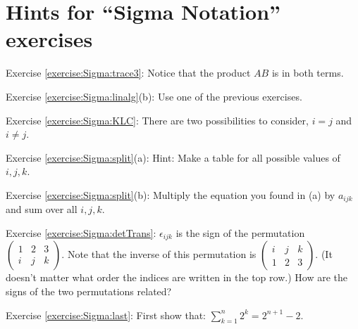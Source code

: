 \section{Hints for ``Sigma Notation'' exercises}\label{sec:sigma:hints} 


\noindent Exercise \ref{exercise:Sigma:trace3}: Notice that the product ${AB}$ is in both terms.

\noindent Exercise \ref{exercise:Sigma:linalg}(b): Use one of the previous exercises.

\noindent Exercise \ref{exercise:Sigma:KLC}: There are two possibilities to consider, $i=j$ and $i \neq j$.

\noindent Exercise \ref{exercise:Sigma:split}(a): Hint: Make a table for all possible values of $i,j,k$.

\noindent Exercise \ref{exercise:Sigma:split}(b): Multiply the equation you found in (a) by $a_{ijk}$ and sum over all $i,j,k$.

\noindent Exercise \ref{exercise:Sigma:detTrans}: $\epsilon_{ijk}$ is the sign of the permutation $\left( \begin{smallmatrix}  1 & 2 & 3  \\ i & j & k  \end{smallmatrix} \right)$. Note that the inverse of this permutation is $ \left( \begin{smallmatrix}  i & j & k  \\ 1 & 2 & 3  \end{smallmatrix} \right)$.  (It doesn't matter what order the indices are written in the top row.) How are the signs of the two permutations related? 


\noindent Exercise \ref{exercise:Sigma:last}: First show that:  $\sum_{k=1}^n 2^k = 2^{n+1} - 2$.
